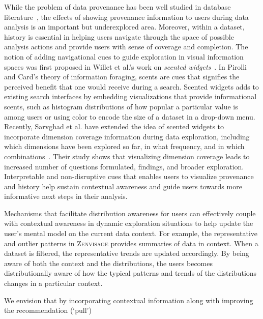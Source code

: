\documentclass[11pt]{article}
\newcommand{\zv}{\textsc{Zenvisage}\xspace}
\begin{document}
\par While the problem of data provenance 
has been well studied in database literature~\cite{Buneman2006,Cui2003,Woodruff1997}, the effects of showing provenance information 
to users during data analysis is an important but underexplored area. 
Moreover, within a dataset, history is essential 
in helping users navigate through the space 
of possible analysis actions and provide users 
with sense of coverage and completion. 
The notion of adding navigational cues 
to guide exploration in visual information spaces 
was first proposed in Willet et al.'s work on \textit{scented widgets}~\cite{Willett2007}. In Pirolli and Card's theory of information foraging, 
scents are cues that signifies the perceived benefit 
that one would receive during a search. 
Scented widgets adds to existing search interfaces 
by embedding visualizations that provide informational scents, 
such as histogram distributions of how popular a particular value is among users or using color to encode the size of a dataset in a drop-down menu. 
Recently, Sarvghad et al. have extended the idea 
of scented widgets to incorporate dimension coverage 
information during data exploration, 
including which dimensions have been explored so far, 
in what frequency, and in which combinations~\cite{Sarvghad2017}. 
Their study shows that visualizing dimension coverage 
leads to increased number of questions formulated, findings, and broader exploration. Interpretable and non-disruptive cues that enables 
users to visualize provenance and history help sustain contextual awareness and guide users towards 
more informative next steps in their analysis.%
\par Mechanisms that facilitate distribution awareness 
for users can effectively couple with contextual awareness 
in dynamic exploration situations 
to help update the user's mental model 
on the current data context. 
For example, the representative and outlier patterns 
in \zv provides summaries of data in context. 
When a dataset is filtered, the representative trends 
are updated accordingly. By being aware of both the 
context and the distributions, the users becomes 
distributionally aware of how the typical patterns 
and trends of the distributions changes in a particular context. %
\par We envision that by incorporating contextual 
information along with improving the recommendation (`pull') 
\end{document}
